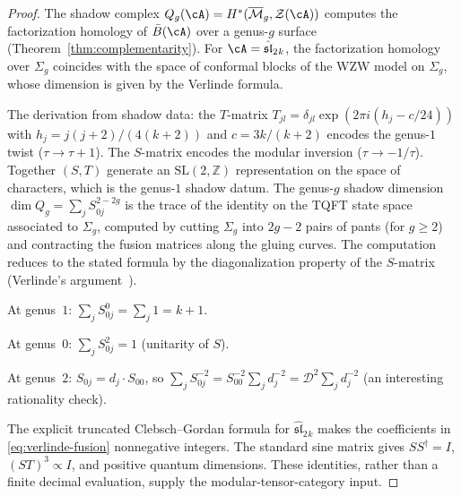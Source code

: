 \begin{proof}
The shadow complex $Q_g(\cA) = H^*(\overline{\mathcal{M}}_g, \mathcal{Z}(\cA))$
computes the factorization homology of $\bar B(\cA)$ over a
genus-$g$ surface (Theorem~\ref{thm:complementarity}). For
$\cA = \hat{\mathfrak{sl}}_2{}_k$, the factorization homology over
$\Sigma_g$ coincides with the space of conformal blocks of the WZW
model on $\Sigma_g$, whose dimension is given by the Verlinde
formula.

The derivation from shadow data: the $T$-matrix
$T_{jl} = \delta_{jl} \exp(2\pi i (h_j - c/24))$ with
$h_j = j(j+2)/(4(k+2))$ and $c = 3k/(k+2)$ encodes the
genus-$1$ twist ($\tau \to \tau + 1$).
The $S$-matrix encodes the modular inversion ($\tau \to -1/\tau$).
Together $(S, T)$ generate an $\mathrm{SL}(2, \mathbb{Z})$
representation on the space of characters, which is the
genus-$1$ shadow datum. The genus-$g$ shadow dimension
$\dim Q_g = \sum_j S_{0j}^{2-2g}$ is the trace of the identity
on the TQFT state space associated to $\Sigma_g$, computed by
cutting $\Sigma_g$ into $2g - 2$ pairs of pants (for $g \ge 2$)
and contracting the fusion matrices along the gluing curves.
The computation reduces to the stated formula by the
diagonalization property of the $S$-matrix (Verlinde's
argument~\cite{Verlinde}).

At genus~$1$: $\sum_j S_{0j}^0 = \sum_j 1 = k+1$.

At genus~$0$: $\sum_j S_{0j}^2 = 1$ (unitarity of $S$).

At genus~$2$: $S_{0j} = d_j \cdot S_{00}$, so
$\sum_j S_{0j}^{-2} = S_{00}^{-2} \sum_j d_j^{-2}
= \mathcal{D}^2 \sum_j d_j^{-2}$
(an interesting rationality check).

The explicit truncated Clebsch--Gordan formula for
$\widehat{\mathfrak{sl}}_2{}_k$ makes the coefficients in
\eqref{eq:verlinde-fusion} nonnegative integers.  The standard sine
matrix gives $SS^\dagger=I$, $(ST)^3\propto I$, and positive quantum
dimensions.  These identities, rather than a finite decimal
evaluation, supply the modular-tensor-category input.
\end{proof}


